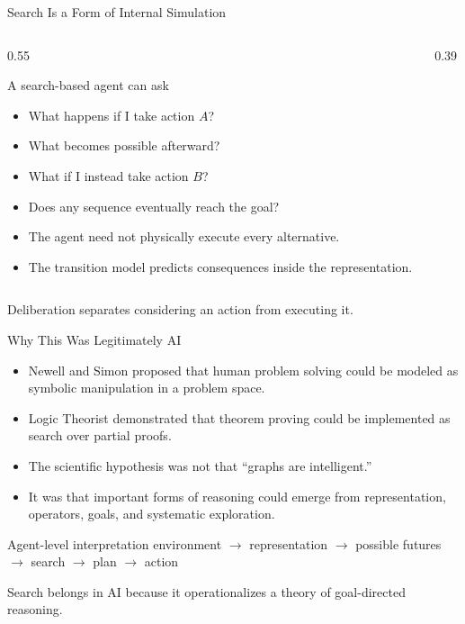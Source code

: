 \documentclass[aspectratio=169,10pt]{beamer}
\begin{document}
\begin{frame}[shrink=20]{Search Is a Form of Internal Simulation}
  \begin{columns}[T,onlytextwidth]
    \begin{column}{0.55\textwidth}
      \begin{block}{A search-based agent can ask}
        \begin{itemize}
          \item What happens if I take action $A$?
          \item What becomes possible afterward?
          \item What if I instead take action $B$?
          \item Does any sequence eventually reach the goal?
        \end{itemize}
      \end{block}

      \begin{itemize}
        \item The agent need not physically execute every alternative.
        \item The transition model predicts consequences inside the representation.
      \end{itemize}
    \end{column}

    \begin{column}{0.39\textwidth}
    \end{column}
  \end{columns}

  \begin{keyidea}
    Deliberation separates considering an action from executing it.
  \end{keyidea}
\end{frame}

\begin{frame}[shrink=20]{Why This Was Legitimately AI}
  \begin{itemize}
    \item Newell and Simon proposed that human problem solving could be modeled as symbolic manipulation in a problem space.
    \item Logic Theorist demonstrated that theorem proving could be implemented as search over partial proofs.
    \item The scientific hypothesis was not that ``graphs are intelligent.''
    \item It was that important forms of reasoning could emerge from representation, operators, goals, and systematic exploration.
  \end{itemize}

  \begin{block}{Agent-level interpretation}
    environment $\rightarrow$ representation $\rightarrow$ possible futures $\rightarrow$ search $\rightarrow$ plan $\rightarrow$ action
  \end{block}

  \begin{keyidea}
    Search belongs in AI because it operationalizes a theory of goal-directed reasoning.
  \end{keyidea}
\end{frame}
\end{document}

